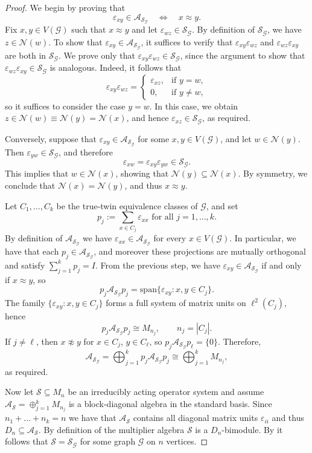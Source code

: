\documentclass[11pt]{amsart}
\numberwithin{equation}{section}
\theoremstyle{plain}
\theoremstyle{definition}
\theoremstyle{remark}
\newcommand{\A}{{\mathcal{A}}}
\newcommand{\G}{{\mathcal{G}}}
\newcommand{\N}{{\mathcal{N}}}
\renewcommand{\S}{{\mathcal{S}}}
\newcommand{\eps}{\varepsilon}
\newcommand{\foral}{\text{ for all }}
\begin{document}
\begin{proof}
We begin by proving that
\[
\varepsilon_{xy} \in \A_{\S_\G}
\quad \Longleftrightarrow \quad
x \approx y.
\]
Fix $x, y\in V(\G)$ such that $x \approx y$ and let $\eps_{wz} \in \S_{\G}$. By definition of $\S_{\G}$, we have $z \in \N(w)$.
To show that $\eps_{xy} \in \A_{\S_\G}$, it suffices to verify that
$\eps_{xy}\eps_{wz}$ and $\eps_{wz}\eps_{xy}$ are both in $\S_{\G}$.
We prove only that $\eps_{xy}\eps_{wz} \in \S_{\G}$, since the argument to show that $\eps_{wz}\eps_{xy} \in \S_{\G}$ is analogous.
Indeed, it follows that
\[
\eps_{xy}\eps_{wz}
=
\begin{cases}
\eps_{xz}, & \text{if } y = w, \\
0, & \text{if } y \neq w,
\end{cases}
\]
so it suffices to consider the case $y = w$.
In this case, we obtain $z \in \N(w)\equiv \N(y) = \N(x)$, and hence
$\eps_{xz} \in \S_{\G}$, as required.

Conversely, suppose that $\eps_{xy} \in \A_{\S_{\G}}$ for some $x, y\in V(\G)$,
and let $w \in \N(y)$.
Then $\eps_{yw} \in \S_{\G}$, and therefore
\[
\eps_{xw} = \eps_{xy}\eps_{yw} \in \S_{\G}.
\]
This implies that $w \in \N(x)$, showing that $\N(y) \subseteq \N(x)$.
By symmetry, we conclude that $\N(x) = \N(y)$, and thus $x \approx y$. 

Let $C_1,\dots,C_k$ be the true-twin equivalence classes of $\G$, and set
\[
p_j := \sum_{x\in C_j} \varepsilon_{xx} \foral j=1,\dots,k.
\]
By definition of $\A_{\S_\G}$ we have $\eps_{xx} \in \A_{\S_\G}$ for every $x\in V(\G)$. In particular, we have that each $p_j \in \A_{\S_\G}$, and moreover these projections are mutually orthogonal and satisfy $\sum_{j=1}^k p_j = I$.
From the previous step, we have
$\varepsilon_{xy} \in \A_{\S_\G}$ if and only if $x\approx y$,
so
\[
p_j \A_{\S_\G} p_j
=
\mathrm{span}\{\varepsilon_{xy} : x, y \in C_j\}.
\]
The family $\{\varepsilon_{xy} : x,y \in C_j\}$ forms a full system of
matrix units on $\ell^2(C_j)$, hence
\[
p_j \A_{\S_\G} p_j \cong M_{n_j},
\qquad n_j = |C_j|.
\]
If $j \neq \ell$, then $x \not\approx y$ for $x \in C_j$, $y \in C_\ell$,
so $p_j \A_{\S_\G} p_\ell = \{0\}$. Therefore,
\[
\A_{\S_\G}
=
\bigoplus_{j=1}^k p_j \A_{\S_\G} p_j
\cong
\bigoplus_{j=1}^k M_{n_j},
\]
as required.

Now let  $\S\subseteq M_n$  be an irreducibly acting operator system and   assume $\A_{\S} = \oplus_{j=1}^k M_{n_j}$ is a block-diagonal algebra in the standard basis.
Since $n_1+\dots+ n_k=n$ we have that $\A_\S$ contains all diagonal matrix units $\eps_{ii}$ and thus $D_n \subseteq \A_{\S}$. By definition of the multiplier algebra $\S$ is a $D_n$-bimodule. By \cite[Proposition 1.1]{PPS89}  it follows that $\S=\S_{\G}$ for some graph $\G$ on $n$ vertices. 
\end{proof}
\end{document}
